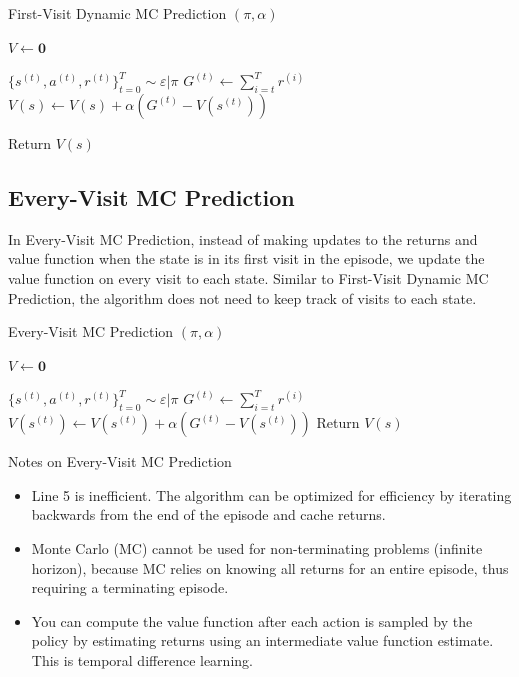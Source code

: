 \documentclass[11pt]{article}
\begin{document}
\begin{algorithm}[H]
\caption{First-Visit Dynamic MC Prediction $(\pi, \alpha)$}
\label{algo:FVDMC}
\begin{algorithmic}[1]
\STATE $V \leftarrow \mathbf{0}$ \hfill
{}

\STATE $\{s^{(t)}, a^{(t)}, r^{(t)}\}_{t=0}^T \sim \varepsilon|\pi$ \hfill 
{}
\STATE $G^{(t)} \leftarrow \sum_{i=t}^T r^{(i)}$ \hfill 
\STATE $V(s) \leftarrow V(s) + \alpha(G^{(t)}-V(s^{(t)}))$  \hfill
\ENDIF

\ENDFOR
\ENDFOR
\STATE Return $V(s)$  \hfill
\end{algorithmic}
\end{algorithm}


\subsection{Every-Visit MC Prediction}
In Every-Visit MC Prediction, instead of making updates to the returns and value function when the state is in its first visit in the episode, we update the value function on every visit to each state. Similar to First-Visit Dynamic MC Prediction, the algorithm does not need to keep track of visits to each state.

\begin{algorithm}[H]
\caption{Every-Visit MC Prediction $(\pi, \alpha)$}
\label{algo:EVMC}
\begin{algorithmic}[1]
\STATE $V \leftarrow \mathbf{0}$ \hfill
{}

\STATE $\{s^{(t)}, a^{(t)}, r^{(t)}\}_{t=0}^T \sim \varepsilon|\pi$ \hfill 
{}
\STATE $G^{(t)} \leftarrow \sum_{i=t}^T r^{(i)}$ \hfill 
\STATE $V(s^{(t)}) \leftarrow V(s^{(t)}) + \alpha(G^{(t)}-V(s^{(t)}))$  \hfill
\ENDFOR
\ENDFOR
\STATE Return $V(s)$  \hfill
\end{algorithmic}
\end{algorithm}

Notes on Every-Visit MC Prediction
\begin{itemize}
    \item Line 5 is inefficient. The algorithm can be optimized for efficiency by iterating backwards from the end of the episode and cache returns. 
    \item Monte Carlo (MC) cannot be used for non-terminating problems (infinite horizon), because MC relies on knowing all returns for an entire episode, thus requiring a terminating episode. 
    \item You can compute the value function after each action is sampled by the policy by estimating returns using an intermediate value function estimate. This is temporal difference learning.
\end{itemize}
\end{document}
